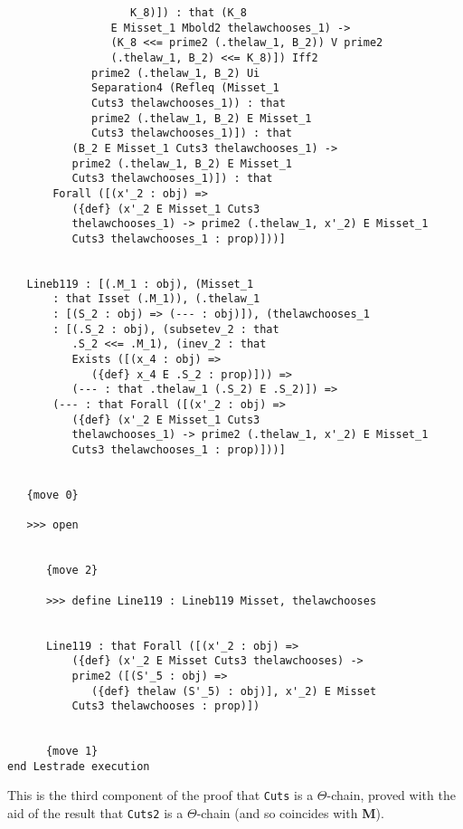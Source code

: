 \documentclass[12pt]{article}
\begin{document}
\begin{verbatim}
                   K_8)]) : that (K_8 
                E Misset_1 Mbold2 thelawchooses_1) -> 
                (K_8 <<= prime2 (.thelaw_1, B_2)) V prime2 
                (.thelaw_1, B_2) <<= K_8)]) Iff2 
             prime2 (.thelaw_1, B_2) Ui 
             Separation4 (Refleq (Misset_1 
             Cuts3 thelawchooses_1)) : that 
             prime2 (.thelaw_1, B_2) E Misset_1 
             Cuts3 thelawchooses_1)]) : that 
          (B_2 E Misset_1 Cuts3 thelawchooses_1) -> 
          prime2 (.thelaw_1, B_2) E Misset_1 
          Cuts3 thelawchooses_1)]) : that 
       Forall ([(x'_2 : obj) => 
          ({def} (x'_2 E Misset_1 Cuts3 
          thelawchooses_1) -> prime2 (.thelaw_1, x'_2) E Misset_1 
          Cuts3 thelawchooses_1 : prop)]))]


   Lineb119 : [(.M_1 : obj), (Misset_1 
       : that Isset (.M_1)), (.thelaw_1 
       : [(S_2 : obj) => (--- : obj)]), (thelawchooses_1 
       : [(.S_2 : obj), (subsetev_2 : that 
          .S_2 <<= .M_1), (inev_2 : that 
          Exists ([(x_4 : obj) => 
             ({def} x_4 E .S_2 : prop)])) => 
          (--- : that .thelaw_1 (.S_2) E .S_2)]) => 
       (--- : that Forall ([(x'_2 : obj) => 
          ({def} (x'_2 E Misset_1 Cuts3 
          thelawchooses_1) -> prime2 (.thelaw_1, x'_2) E Misset_1 
          Cuts3 thelawchooses_1 : prop)]))]


   {move 0}

   >>> open


      {move 2}

      >>> define Line119 : Lineb119 Misset, thelawchooses


      Line119 : that Forall ([(x'_2 : obj) => 
          ({def} (x'_2 E Misset Cuts3 thelawchooses) -> 
          prime2 ([(S'_5 : obj) => 
             ({def} thelaw (S'_5) : obj)], x'_2) E Misset 
          Cuts3 thelawchooses : prop)])


      {move 1}
end Lestrade execution
\end{verbatim}

This is the third component of the proof that {\tt Cuts} is a $\Theta$-chain, proved with the aid of the result that {\tt Cuts2} is a $\Theta$-chain (and so coincides with {\bf M}).
\end{document}

